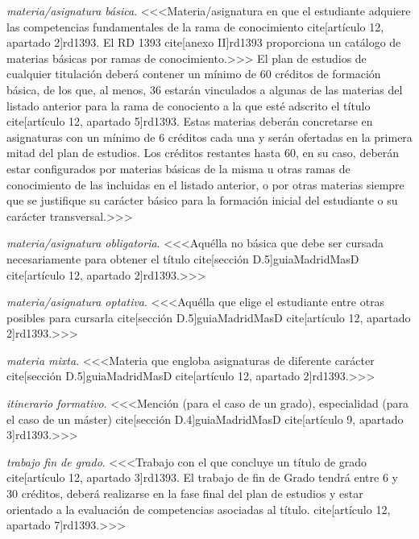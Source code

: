     \item \emph{materia/asignatura básica}. <<<Materia/asignatura en que el estudiante adquiere las competencias fundamentales de la rama de conocimiento cite[artículo 12, apartado 2]{rd1393}. El RD 1393 cite[anexo II]{rd1393} proporciona un catálogo de materias básicas por ramas de conocimiento.>>> El plan de estudios de cualquier titulación deberá contener un mínimo de 60 créditos de formación básica, de los que, al menos, 36 estarán vinculados a algunas de las materias del listado anterior para la rama de conociento a la que esté adscrito el título cite[artículo 12, apartado 5]{rd1393}.  Estas materias deberán concretarse en asignaturas con un mínimo de 6 créditos cada una y serán ofertadas en la primera mitad del plan de estudios.  Los créditos restantes hasta 60, en su caso, deberán estar configurados por materias básicas de la misma u otras ramas de conocimiento de las incluidas en el listado anterior, o por otras materias siempre que se justifique su carácter básico para la formación inicial del estudiante o su carácter transversal.>>>

    \item \emph{materia/asignatura obligatoria}. <<<Aquélla no básica que debe ser cursada necesariamente para obtener el título cite[sección D.5]{guiaMadridMasD} cite[artículo 12, apartado 2]{rd1393}.>>>

    \item \emph{materia/asignatura optativa}. <<<Aquélla que elige el estudiante entre otras posibles para cursarla cite[sección D.5]{guiaMadridMasD} cite[artículo 12, apartado 2]{rd1393}.>>>

    \item \emph{materia mixta}. <<<Materia que engloba asignaturas de diferente carácter cite[sección D.5]{guiaMadridMasD} cite[artículo 12, apartado 2]{rd1393}.>>>

    \item \emph{itinerario formativo}. <<<Mención (para el caso de un grado), especialidad (para el caso de un máster) cite[sección D.4]{guiaMadridMasD} cite[artículo 9, apartado 3]{rd1393}.>>>
 
    \item \emph{trabajo fin de grado}. <<<Trabajo con el que concluye un título de grado cite[artículo 12, apartado 3]{rd1393}. El trabajo de fin de Grado tendrá entre 6 y 30 créditos, deberá realizarse en la fase final del plan de estudios y estar orientado a la evaluación de competencias asociadas al título. cite[artículo 12, apartado 7]{rd1393}.>>>

